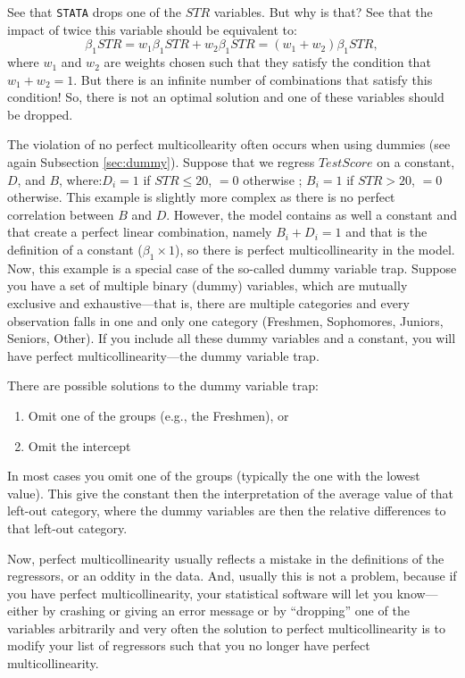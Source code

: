 \documentclass[
]{book}
\providecommand{\tightlist}{%
  \setlength{\itemsep}{0pt}\setlength{\parskip}{0pt}}
\begin{document}
See that \texttt{STATA} drops one of the \(STR\) variables. But why is that? See that the impact of twice this variable should be equivalent to:
\begin{equation}
\beta_1 STR = w_1 \beta_1 STR + w_2 \beta_1 STR = (w_1 + w_2) \beta_1 STR , 
\end{equation}
where \(w_1\) and \(w_2\) are weights chosen such that they satisfy the condition that \(w_1 + w_2 = 1\). But there is an infinite number of combinations that satisfy this condition! So, there is not an optimal solution and one of these variables should be dropped.

The violation of no perfect multicollearity often occurs when using dummies (see again Subsection \ref{sec:dummy}). Suppose that we regress \(TestScore\) on a constant, \(D\), and \(B\), where:\(D_i =1\) if \(STR \leq 20\), \(=0\) otherwise ; \(B_i =1\) if \(STR>20\), \(= 0\) otherwise. This example is slightly more complex as there is no perfect correlation between \(B\) and \(D\). However, the model contains as well a constant and that create a perfect linear combination, namely \(B_i + D_i = 1\) and that is the definition of a constant (\(\beta_1 \times 1\)), so there is perfect multicollinearity in the model. Now, this example is a special case of the so-called dummy variable trap. Suppose you have a set of multiple binary (dummy) variables, which are mutually exclusive and exhaustive---that is, there are multiple categories and every observation falls in one and only one category (Freshmen, Sophomores, Juniors, Seniors, Other). If you include all these dummy variables and a constant, you will have perfect multicollinearity---the dummy variable trap.

There are possible solutions to the dummy variable trap:

\begin{enumerate}
\def\labelenumi{\arabic{enumi}.}
\tightlist
\item
  Omit one of the groups (e.g., the Freshmen), or
\item
  Omit the intercept
\end{enumerate}

In most cases you omit one of the groups (typically the one with the lowest value). This give the constant then the interpretation of the average value of that left-out category, where the dummy variables are then the relative differences to that left-out category.

Now, perfect multicollinearity usually reflects a mistake in the definitions of the regressors, or an oddity in the data. And, usually this is not a problem, because if you have perfect multicollinearity, your statistical software will let you know---either by crashing or giving an error message or by ``dropping'' one of the variables arbitrarily and very often the solution to perfect multicollinearity is to modify your list of regressors such that you no longer have perfect multicollinearity.
\end{document}
